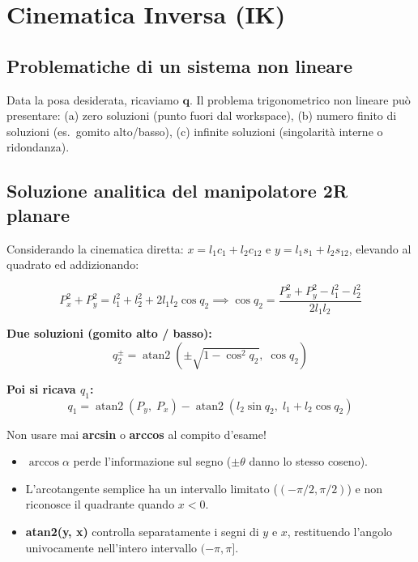 \documentclass[11pt, a4paper]{article}
\newcommand{\atan}{\operatorname{atan2}}
\begin{document}
\section{Cinematica Inversa (IK)}

\subsection{Problematiche di un sistema non lineare}

Data la posa desiderata, ricaviamo $\mathbf{q}$. Il problema trigonometrico non lineare
può presentare: (a) zero soluzioni (punto fuori dal workspace), (b) numero finito di
soluzioni (es.\ gomito alto/basso), (c) infinite soluzioni (singolarità interne o ridondanza).

\subsection{Soluzione analitica del manipolatore 2R planare}

Considerando la cinematica diretta:
$x = l_1 c_1 + l_2 c_{12}$ e $y = l_1 s_1 + l_2 s_{12}$,
elevando al quadrato ed addizionando:

\begin{formulabox}
\[
P_x^2 + P_y^2 = l_1^2 + l_2^2 + 2l_1 l_2\cos q_2
\implies
\cos q_2 = \frac{P_x^2 + P_y^2 - l_1^2 - l_2^2}{2l_1 l_2}
\]

\medskip
\textbf{Due soluzioni (gomito alto / basso):}
\[
q_2^\pm = \atan\!\left(\pm\sqrt{1-\cos^2 q_2},\; \cos q_2\right)
\]

\medskip
\textbf{Poi si ricava $q_1$:}
\[
q_1 = \atan(P_y,\; P_x) - \atan\!\left(l_2\sin q_2,\; l_1 + l_2\cos q_2\right)
\]
\end{formulabox}

\begin{examcheck}
Non usare mai \textbf{arcsin} o \textbf{arccos} al compito d'esame!
\begin{itemize}[itemsep=2pt]
  \item $\arccos\alpha$ perde l'informazione sul segno ($\pm\theta$ danno lo stesso coseno).
  \item L'arcotangente semplice ha un intervallo limitato ($(-\pi/2, \pi/2)$) e non riconosce
        il quadrante quando $x < 0$.
  \item \textbf{atan2(y, x)} controlla separatamente i segni di $y$ e $x$, restituendo l'angolo
        univocamente nell'intero intervallo $(-\pi, \pi]$.
\end{itemize}
\end{examcheck}
\end{document}
